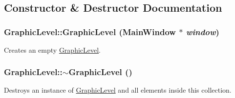\subsection{Constructor \& Destructor Documentation}
\hypertarget{classGraphicLevel_a4606d4095ca81e939494e806c0cf3d56}{
\subsubsection[{GraphicLevel}]{\setlength{\rightskip}{0pt plus 5cm}GraphicLevel::GraphicLevel ({\bf MainWindow} $\ast$ {\em window})}}
\label{classGraphicLevel_a4606d4095ca81e939494e806c0cf3d56}
Creates an empty \hyperlink{classGraphicLevel}{GraphicLevel}. \hypertarget{classGraphicLevel_a6d8b5d675010d96d22c1393a926e9e9c}{
\subsubsection[{$\sim$GraphicLevel}]{\setlength{\rightskip}{0pt plus 5cm}GraphicLevel::$\sim$GraphicLevel ()}}
\label{classGraphicLevel_a6d8b5d675010d96d22c1393a926e9e9c}
Destroys an instance of \hyperlink{classGraphicLevel}{GraphicLevel} and all elements inside this collection. 

